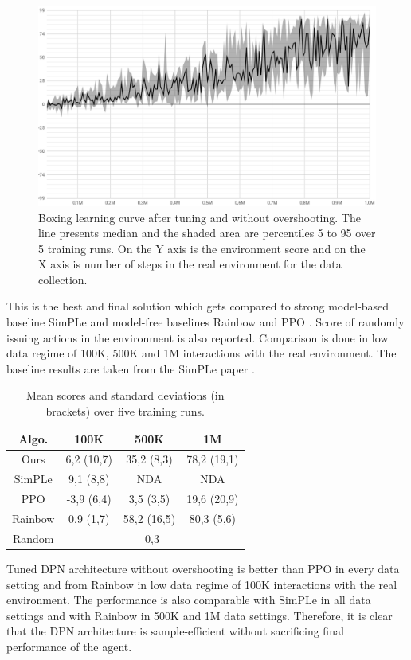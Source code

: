 \begin{figure}[H]
\includegraphics[width=1\textwidth,keepaspectratio]{figures/PlaNet/Boxing_without_overshooting.png}
\caption[Boxing learning curve after tuning and without overshooting]{Boxing learning curve after tuning and without overshooting. The line presents median and the shaded area are percentiles 5 to 95 over 5 training runs. On the Y axis is the environment score and on the X axis is number of steps in the real environment for the data collection.}
\label{Fig.Boxing_without_overshooting}
\end{figure}

This is the best and final solution which gets compared to strong model-based baseline SimPLe \cite{Algo.SimPLe} and model-free baselines Rainbow \cite{Algo.Rainbow} and PPO \cite{Algo.PPO}. Score of randomly issuing actions in the environment is also reported. Comparison is done in low data regime of 100K, 500K and 1M interactions with the real environment. The baseline results are taken from the SimPLe paper \cite{Algo.SimPLe}.

\begin{table}[H]
\centering
\begin{tabular}{|c | c c c|} 
\hline
Algo.   & 100K        & 500K        & 1M          \\
\hline
Ours    &  6,2 (10,7) & 35,2  (8,3) & 78,2 (19,1) \\ 
SimPLe  &  9,1  (8,8) & NDA         & NDA         \\
PPO     & -3,9  (6,4) &  3,5  (3,5) & 19,6 (20,9) \\
Rainbow &  0,9  (1,7) & 58,2 (16,5) & 80,3  (5,6) \\
Random  & \multicolumn{3}{c|}{0,3}                \\
\hline
\end{tabular}
\caption[Results comparison]{Mean scores and standard deviations (in brackets) over five training runs.}
\label{Table.Results}
\end{table}

Tuned DPN architecture without overshooting is better than PPO in every data setting and from Rainbow in low data regime of 100K interactions with the real environment. The performance is also comparable with SimPLe in all data settings and with Rainbow in 500K and 1M data settings. Therefore, it is clear that the DPN architecture is sample-efficient without sacrificing final performance of the agent.
